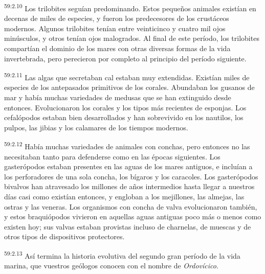 \par
\textsuperscript{59:2.10} Los trilobites seguían predominando. Estos pequeños animales existían en decenas de miles de especies, y fueron los predecesores de los crustáceos modernos. Algunos trilobites tenían entre veinticinco y cuatro mil ojos minúsculos, y otros tenían ojos malogrados. Al final de este período, los trilobites compartían el dominio de los mares con otras diversas formas de la vida invertebrada, pero perecieron por completo al principio del período siguiente.

\par
\textsuperscript{59:2.11} Las algas que secretaban cal estaban muy extendidas. Existían miles de especies de los antepasados primitivos de los corales. Abundaban los gusanos de mar y había muchas variedades de medusas que se han extinguido desde entonces. Evolucionaron los corales y los tipos más recientes de esponjas. Los cefalópodos estaban bien desarrollados y han sobrevivido en los nautilos, los pulpos, las jibias y los calamares de los tiempos modernos.

\par
\textsuperscript{59:2.12} Había muchas variedades de animales con conchas, pero entonces no las necesitaban tanto para defenderse como en las épocas siguientes. Los gasterópodos estaban presentes en las aguas de los mares antiguos, e incluían a los perforadores de una sola concha, los bígaros y los caracoles. Los gasterópodos bivalvos han atravesado los millones de años intermedios hasta llegar a nuestros días casi como existían entonces, y engloban a los mejillones, las almejas, las ostras y las veneras. Los organismos con concha de valva evolucionaron también, y estos braquiópodos vivieron en aquellas aguas antiguas poco más o menos como existen hoy; sus valvas estaban provistas incluso de charnelas, de muescas y de otros tipos de dispositivos protectores.

\par
\textsuperscript{59:2.13} Así termina la historia evolutiva del segundo gran período de la vida marina, que vuestros geólogos conocen con el nombre de \textit{Ordovícico}.

